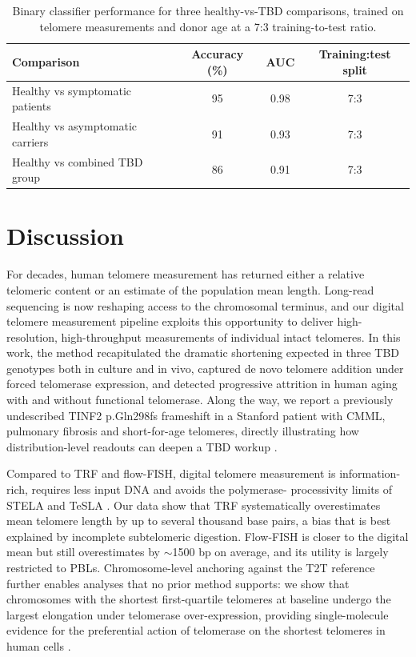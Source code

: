 \documentclass[11pt]{article}
\begin{document}
\begin{table}[htbp]
\centering
\caption{Binary classifier performance for three healthy-vs-TBD comparisons,
trained on telomere measurements and donor age at a 7:3 training-to-test ratio.}
\label{tab:classifier}
\begin{tabular}{lccc}
\toprule
Comparison & Accuracy (\%) & AUC & Training:test split \\
\midrule
Healthy vs symptomatic patients     & 95 & 0.98 & 7:3 \\
Healthy vs asymptomatic carriers    & 91 & 0.93 & 7:3 \\
Healthy vs combined TBD group       & 86 & 0.91 & 7:3 \\
\bottomrule
\end{tabular}
\end{table}

\section{Discussion}

For decades, human telomere measurement has returned either a relative
telomeric content or an estimate of the population mean length.
Long-read sequencing is now reshaping access to the chromosomal
terminus, and our digital telomere measurement pipeline exploits this
opportunity to deliver high-resolution, high-throughput measurements of
individual intact telomeres. In this work, the method recapitulated the
dramatic shortening expected in three TBD genotypes both in culture and
in vivo, captured de novo telomere addition under forced telomerase
expression, and detected progressive attrition in human aging with and
without functional telomerase. Along the way, we report a previously
undescribed TINF2 p.Gln298fs frameshift in a Stanford patient with
CMML, pulmonary fibrosis and short-for-age telomeres, directly
illustrating how distribution-level readouts can deepen a TBD workup
\citep{savage2008tinf2,alder2018diagnostic}.

Compared to TRF and flow-FISH, digital telomere measurement is
information-rich, requires less input DNA and avoids the polymerase-
processivity limits of STELA and TeSLA
\citep{baird2003extensive,lai2018comparison}. Our data show that TRF
systematically overestimates mean telomere length by up to several
thousand base pairs, a bias that is best explained by incomplete
subtelomeric digestion. Flow-FISH is closer to the digital mean but
still overestimates by $\sim$1500 bp on average, and its utility is
largely restricted to PBLs. Chromosome-level anchoring against the T2T
reference further enables analyses that no prior method supports: we
show that chromosomes with the shortest first-quartile telomeres at
baseline undergo the largest elongation under telomerase over-expression,
providing single-molecule evidence for the preferential action of
telomerase on the shortest telomeres in human cells
\citep{teixeira2004intertelomere,hemann2001shortest,britt2012preferential}.
\end{document}

